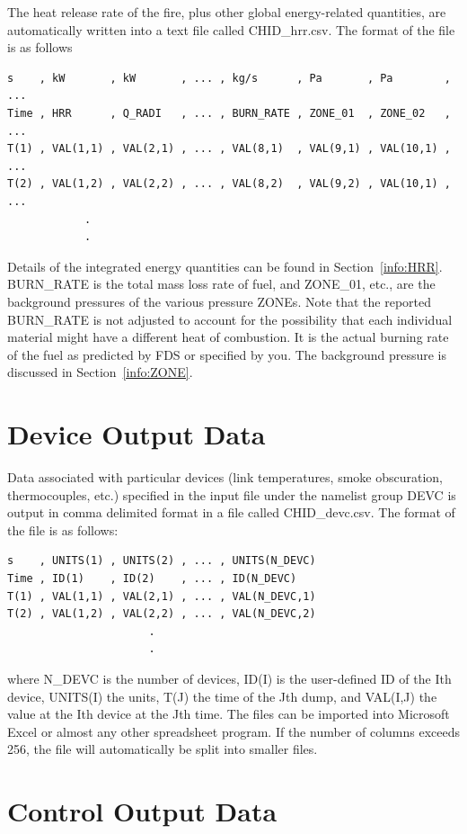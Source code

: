 \documentclass[11pt]{book}
\begin{document}
\label{out:hrr}
The heat release rate of the fire, plus other global energy-related quantities, are automatically written into a text file
called {\ct CHID\_hrr.csv}. The format of the file is as follows
\begin{lstlisting}
s    , kW       , kW       , ... , kg/s      , Pa       , Pa        , ...
Time , HRR      , Q_RADI   , ... , BURN_RATE , ZONE_01  , ZONE_02   , ...
T(1) , VAL(1,1) , VAL(2,1) , ... , VAL(8,1)  , VAL(9,1) , VAL(10,1) , ...
T(2) , VAL(1,2) , VAL(2,2) , ... , VAL(8,2)  , VAL(9,2) , VAL(10,1) , ...
            .
            .
 \end{lstlisting}
Details of the integrated energy quantities can be found in Section~\ref{info:HRR}. {\ct BURN\_RATE} is the total mass loss rate of fuel, and {\ct ZONE\_01}, etc., are the background pressures of the various pressure {\ct ZONE}s. Note that the reported {\ct BURN\_RATE} is not adjusted to account for the possibility that each individual material might have a different heat of combustion. It is the actual burning rate of the fuel as predicted by FDS or specified by you. The background pressure is discussed in Section~\ref{info:ZONE}.


\section{Device Output Data}
\label{out:DEVC}

Data associated with particular devices (link temperatures, smoke obscuration, thermocouples, etc.) specified in the input file under the namelist group {\ct DEVC} is output in comma delimited format in a file called {\ct CHID\_devc.csv}. The format of the file is as follows:
\begin{lstlisting}
s    , UNITS(1) , UNITS(2) , ... , UNITS(N_DEVC)
Time , ID(1)    , ID(2)    , ... , ID(N_DEVC)
T(1) , VAL(1,1) , VAL(2,1) , ... , VAL(N_DEVC,1)
T(2) , VAL(1,2) , VAL(2,2) , ... , VAL(N_DEVC,2)
                      .
                      .
\end{lstlisting}
where {\ct N\_DEVC} is the number of devices, {\ct ID(I)} is the user-defined ID of the {\ct I}th device, {\ct UNITS(I)} the units, {\ct T(J)} the time of the {\ct J}th dump, and
{\ct VAL(I,J)} the value at the {\ct I}th device at the {\ct J}th time. The files can be imported into Microsoft Excel or almost any other spreadsheet program. If the number of columns exceeds 256, the file will automatically be split into smaller files.

\section{Control Output Data}
\label{out:CTRL}
\end{document}
